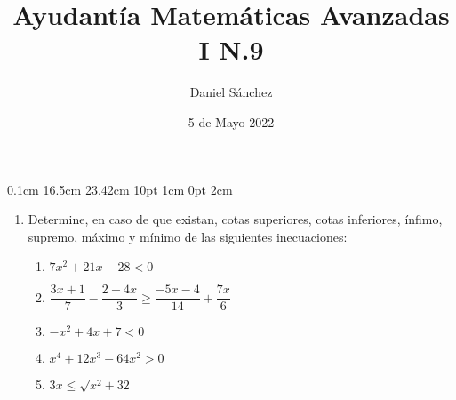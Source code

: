\documentclass[12pt]{article}
\begin{document}
\setmargins{2.5cm}
{0.1cm}
{16.5cm}
{23.42cm}
{10pt}
{1cm}
{0pt}
{2cm}

\title{Ayudant\'ia Matem\'aticas Avanzadas I N.9}
\date{5 de Mayo 2022}
\author{Daniel S\'anchez}
\maketitle

\begin{enumerate}
	\item Determine, en caso de que existan, cotas superiores, cotas inferiores, ínfimo, supremo, máximo y mínimo de las siguientes inecuaciones:
	      \begin{enumerate}
		      \item $7x^2+21x-28<0$
		      \item $\dfrac{3x+1}{7}-\dfrac{2-4x}{3}\geq \dfrac{-5x-4}{14}+\dfrac{7x}{6}$
		      \item $-x^2+4x+7<0$
		      \item $x^4+12x^3-64x^2>0$
		      \item $3x \leq \sqrt{x^2+32}$
	      \end{enumerate}
\end{enumerate}
\end{document}
